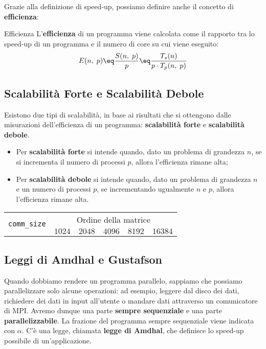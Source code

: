 Grazie alla definizione di speed-up, possiamo definire anche il concetto di \textbf{efficienza}:

\begin{definition}{Efficienza}
    L'\textbf{efficienza} di un programma viene calcolata come il rapporto tra lo speed-up di un programma e il numero di core su cui viene eseguito:
    \[ E(n, \; p) \eq \frac{S(n, \; p)}{p} \eq \frac{T_s(n)}{p \cdot T_p(n, \; p)} \]
\end{definition}

\subsection{Scalabilità Forte e Scalabilità Debole}

Esistono due tipi di scalabilità, in base ai risultati che si ottengono dalle misurazioni dell'efficienza di un programma: \textbf{scalabilità forte} e \textbf{scalabilità debole}.

\begin{itemize}
    \item Per \textbf{scalabilità forte} si intende quando, dato un problema di grandezza $n$, se si incrementa il numero di processi $p$, allora l'efficienza rimane alta;
    \item Per \textbf{scalabilità debole} si intende quando, dato un problema di grandezza $n$ e un numero di processi $p$, se incrementando ugualmente $n$ e $p$, allora l'efficienza rimane alta.
\end{itemize}

\begin{center}
    \begin{tabular}{|c||c|c|c|c|c|}
        \hline
        \multirow{2}{*}{ \texttt{comm\_size} } & \multicolumn{5}{c|}{Ordine della matrice} \\
         & $1024$ & $2048$ & $4096$ & $8192$ & $16384$ \\
        \hline\hline
    \end{tabular}
\end{center}


\subsection{Leggi di Amdhal e Gustafson}

Quando dobbiamo rendere un programma parallelo, sappiamo che possiamo parallelizzare solo alcune operazioni: ad esempio, leggere dal disco dei dati, richiedere dei dati in input all'utente o mandare dati attraverso un comunicatore di MPI. Avremo dunque una parte \textbf{sempre sequenziale} e una parte \textbf{parallelizzabile}. La frazione del programma sempre sequenziale viene indicata con $\alpha$. C'è una legge, chiamata \textbf{legge di Amdhal}, che definisce lo speed-up possibile di un'applicazione.

